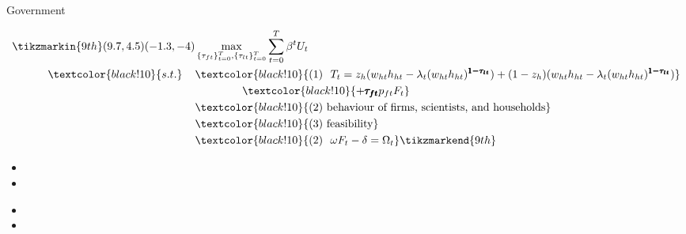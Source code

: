\documentclass[11pt,aspectratio=169]{beamer}
\begin{document}
\begin{frame}{ Government}
	\begin{minipage}[t!]{1\textwidth}
		\begin{align*}
		\tikzmarkin{9th}(9.7,4.5)(-1.3,-4)
		&\max_{\{\tau_{ft}\}_{t=0}^{T}, \{\tau_{lt}\}_{t=0}^{T}} \sum_{t=0}^{T}\beta^t U_{t}\\
	\textcolor{black!10}{s.t.} \hspace{4mm}
		&\textcolor{black!10}{ (1)\ \ T_t= z_h(w_{ht}h_{ht}-\lambda_t(w_{ht}h_{ht})^{{\pmb{1-\tau_{lt}}}})+(1-z_h)(w_{ht}h_{ht}-\lambda_t(w_{ht}h_{ht})^{{\pmb{1-\tau_{lt}}}})}\\ & \hspace{15mm } \textcolor{black!10}{+{\pmb{\tau_{ft}}}p_{ft}F_{t}}\\
		& \textcolor{black!10}{(2)\ \text{behaviour of firms, scientists, and households}}\\
		& \textcolor{black!10}{(3)\ \text{feasibility} }\\
		&\textcolor{black!10}{
			(2)\ \  \omega F_t-\delta =\Omega_t }
		\tikzmarkend{9th}
		\end{align*}
	\end{minipage}
	
	\small
	\vspace{0mm}
	\begin{minipage}[t!]{0.35\textwidth}
		\vspace{7mm}
		\begin{itemize}
			\item[] %
			\item[] 
		\end{itemize}
	\end{minipage}
	\begin{minipage}[t!]{0.6\textwidth}
		\vspace{8mm}
		\begin{itemize}
			\item[]%
			\vspace{0mm}	
			\item[] %
		\end{itemize}
	\end{minipage}
\end{frame}
\end{document}

